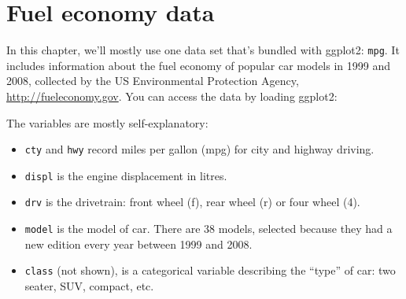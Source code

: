 \hypertarget{sec:fuel-economy-data}{%
\section{Fuel economy data}\label{sec:fuel-economy-data}}

In this chapter, we'll mostly use one data set that's bundled with
ggplot2: \texttt{mpg}. It includes information about the fuel economy of
popular car models in 1999 and 2008, collected by the US Environmental
Protection Agency, \url{http://fueleconomy.gov}. You can access the data
by loading ggplot2: 

\begin{Shaded}
\begin{Highlighting}[]
\end{Highlighting}
\end{Shaded}

The variables are mostly self-explanatory:

\begin{itemize}
\item
  \texttt{cty} and \texttt{hwy} record miles per gallon (mpg) for city
  and highway driving.
\item
  \texttt{displ} is the engine displacement in litres.
\item
  \texttt{drv} is the drivetrain: front wheel (f), rear wheel (r) or
  four wheel (4).
\item
  \texttt{model} is the model of car. There are 38 models, selected
  because they had a new edition every year between 1999 and 2008.
\item
  \texttt{class} (not shown), is a categorical variable describing the
  ``type'' of car: two seater, SUV, compact, etc.
\end{itemize}

